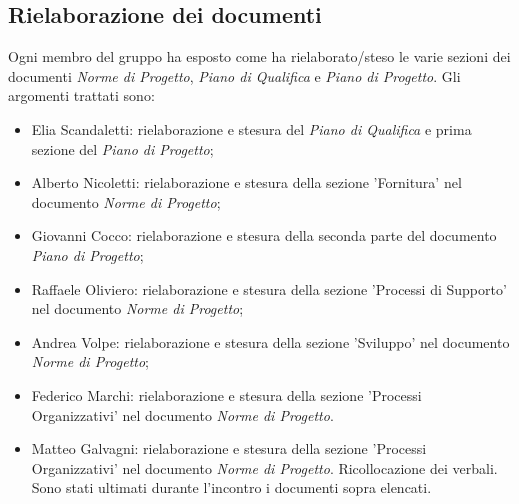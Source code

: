 \documentclass[a4paper, 12pt]{article}
\begin{document}
\subsection{Rielaborazione dei documenti}
Ogni membro del gruppo ha esposto come ha rielaborato/steso le varie sezioni dei documenti \textit{Norme di Progetto}, \textit{Piano di Qualifica} e \textit{Piano di Progetto}. Gli argomenti trattati sono:
\begin{itemize}
	\item Elia Scandaletti: rielaborazione e stesura del \textit{Piano di Qualifica} e prima sezione del \textit{Piano di Progetto};
	\item Alberto Nicoletti: rielaborazione e stesura della sezione 'Fornitura' nel documento \textit{Norme di Progetto};
	\item Giovanni Cocco: rielaborazione e stesura della seconda parte del documento \textit{Piano di Progetto};
	\item Raffaele Oliviero: rielaborazione e stesura della sezione 'Processi di Supporto' nel documento \textit{Norme di Progetto};
	\item Andrea Volpe: rielaborazione e stesura della sezione 'Sviluppo' nel documento \textit{Norme di Progetto};
	\item Federico Marchi: rielaborazione e stesura della sezione 'Processi Organizzativi' nel documento \textit{Norme di Progetto}.
	\item Matteo Galvagni: rielaborazione e stesura della sezione 'Processi Organizzativi' nel documento \textit{Norme di Progetto}. Ricollocazione dei verbali.\\
Sono stati ultimati durante l'incontro i documenti sopra elencati.
\end{itemize}
\end{document}
